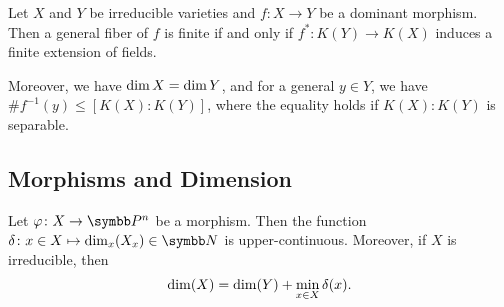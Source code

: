 \begin{theorem}
  Let $X$ and $Y$ be irreducible varieties and $f\colon X\to Y$ be a dominant morphism. Then a general fiber of $f$ is finite if and only if $f^*\colon K(Y)\to K(X)$ induces a finite extension of fields.

  Moreover, we have $\operatorname{dim} X=\operatorname{dim} Y$, and for a general $y\in Y$, we have $\#f^{-1}(y)\leq [K(X):K(Y)]$, where the equality holds if $K(X):K(Y)$ is separable.
\end{theorem}

\subsection{Morphisms and Dimension}

\begin{theorem}
  Let $\varphi\colon X\to \PP^n$ be a morphism. Then the function $\delta\colon x\in X\mapsto \DIM_x (X_x)\in \NN$ is upper-continuous. Moreover, if $X$ is irreducible, then
  \begin{equation}
    \operatorname{dim} (X)=\operatorname{dim} (Y) + \operatorname*{min}_{x\in X}\delta(x).
  \end{equation}
\end{theorem}
